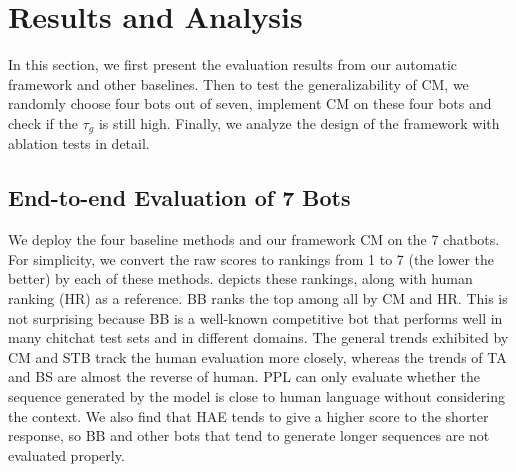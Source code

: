 \section{Results and Analysis}
\label{sec:main}
In this section, we first present the evaluation results from our automatic framework 
and other baselines.
Then to test the generalizability of CM, we randomly choose four bots out of seven, implement CM on these four bots and check if the $\tau_g$ is still high.
 Finally, we analyze the design of the framework with ablation tests in detail.  

\subsection{End-to-end Evaluation of 7 Bots}
We deploy the four baseline methods and our framework CM on the 7 chatbots.
For simplicity, we convert the raw scores to rankings from 1 to 7 (the lower
the better) by
each of these methods.  depicts these rankings,
along with human ranking (HR) as a reference.
BB ranks the top among all by CM and HR. 
This is not surprising because BB is a well-known competitive bot 
that performs well in many chitchat test sets and in different domains. 
The general trends exhibited by CM and STB track the human 
evaluation more
closely, whereas the trends of TA and BS are almost the reverse of human.  
PPL can only evaluate whether the sequence generated by the model is 
close to human language without considering the context. 
We also find that HAE tends to give a higher score to the shorter response, 
so BB and other bots that tend to generate longer sequences are not evaluated
properly.

